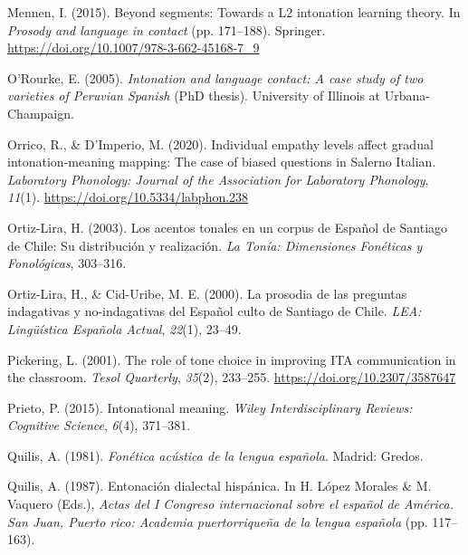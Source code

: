 \documentclass[]{article}
\newlength{\cslhangindent}
\newenvironment{CSLReferences}[2] %
 {%
  \setlength{\parindent}{0pt}
  \ifodd #1 \everypar{\setlength{\hangindent}{\cslhangindent}}\ignorespaces\fi
  \ifnum #2 > 0
  \setlength{\parskip}{#2\baselineskip}
  \fi
 }%
 {}
\begin{document}
\begin{CSLReferences}{1}{0}
\leavevmode{}%
Mennen, I. (2015). Beyond segments: {T}owards a {L}2 intonation learning theory. In \emph{Prosody and language in contact} (pp. 171--188). Springer. \url{https://doi.org/10.1007/978-3-662-45168-7_9}

\leavevmode{}%
O'Rourke, E. (2005). \emph{Intonation and language contact: {A} case study of two varieties of {P}eruvian {S}panish} (PhD thesis). {University of Illinois at Urbana-Champaign}.

\leavevmode{}%
Orrico, R., \& D'Imperio, M. (2020). Individual empathy levels affect gradual intonation-meaning mapping: The case of biased questions in {S}alerno {I}talian. \emph{Laboratory Phonology: Journal of the Association for Laboratory Phonology}, \emph{11}(1). \url{https://doi.org/10.5334/labphon.238}

\leavevmode{}%
Ortiz-Lira, H. (2003). Los acentos tonales en un corpus de {E}spañol de {Santiago de Chile}: Su distribución y realización. \emph{La Tonía: Dimensiones Fonéticas y Fonológicas}, 303--316.

\leavevmode{}%
Ortiz-Lira, H., \& Cid-Uribe, M. E. (2000). La prosodia de las preguntas indagativas y no-indagativas del {E}spañol culto de {S}antiago de {C}hile. \emph{LEA: Lingüística {E}spañola {A}ctual}, \emph{22}(1), 23--49.

\leavevmode{}%
Pickering, L. (2001). The role of tone choice in improving {ITA} communication in the classroom. \emph{Tesol Quarterly}, \emph{35}(2), 233--255. \url{https://doi.org/10.2307/3587647}

\leavevmode{}%
Prieto, P. (2015). Intonational meaning. \emph{Wiley Interdisciplinary Reviews: Cognitive Science}, \emph{6}(4), 371--381.

\leavevmode{}%
Quilis, A. (1981). \emph{Fon{é}tica ac{ú}stica de la lengua espa{ñ}ola}. Madrid: Gredos.

\leavevmode{}%
Quilis, A. (1987). Entonación dialectal hispánica. In H. López Morales \& M. Vaquero (Eds.), \emph{{A}ctas del {I} {C}ongreso internacional sobre el español de {A}mérica. {S}an {J}uan, {P}uerto rico: {A}cademia puertorriqueña de la lengua española} (pp. 117--163).


\end{CSLReferences}
\end{document}
